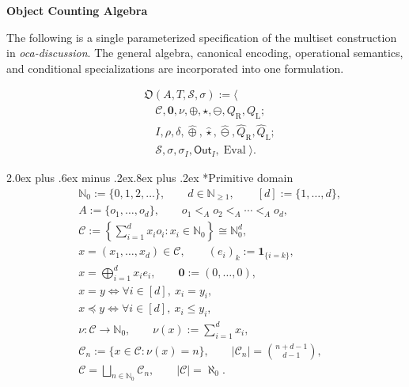 \documentclass[10pt,a5paper]{article}
\makeatletter
\renewcommand\section{\@startsection{section}{1}{\z@}%
  {2.0ex plus .6ex minus .2ex}{.8ex plus .2ex}%
  {\normalfont\large\bfseries}}
\makeatother
\begin{document}
{\LARGE\bfseries Object Counting Algebra\par}
\vspace{2pt}

The following is a single parameterized specification of the multiset construction in \emph{oca-discussion}. The general algebra, canonical encoding, operational semantics, and conditional specializations are incorporated into one formulation.

\[
\boxed{
\begin{aligned}
&\mathfrak O(A,T,\mathscr S,\sigma)
:=\Big\langle
\\[3pt]
&\quad
\mathcal C,\mathbf 0,\nu,\oplus,\star,\ominus,Q_{\mathrm R},Q_{\mathrm L};
\\[3pt]
&\quad
I,\rho,\delta,
\widehat{\oplus},\widehat{\star},\widehat{\ominus},
\widehat Q_{\mathrm R},\widehat Q_{\mathrm L};
\\[3pt]
&\quad
\mathscr S,\sigma,\sigma_I,\mathsf{Out}_I,\operatorname{Eval}
\Big\rangle .
\end{aligned}
}
\]

\section*{Primitive domain}
\begin{align*}
&\mathbb N_0:=\{0,1,2,\ldots\},
\qquad
d\in\mathbb N_{\geq 1},
\qquad
[d]:=\{1,\ldots,d\},
\\
&A:=\{o_1,\ldots,o_d\},
\qquad
o_1<_A o_2<_A\cdots<_A o_d,
\\
&\mathcal C
:=
\left\{
\sum_{i=1}^{d}x_i o_i:
x_i\in\mathbb N_0
\right\}
\cong
\mathbb N_0^{d},
\\
&x=(x_1,\ldots,x_d)\in\mathcal C,
\qquad
(e_i)_k:=\mathbf 1_{\{i=k\}},
\\
&x=\bigoplus_{i=1}^{d}x_i e_i,
\qquad
\mathbf 0:=(0,\ldots,0),
\\
&x=y
\iff
\forall i\in[d],\ x_i=y_i,
\\
&x\preccurlyeq y
\iff
\forall i\in[d],\ x_i\leq y_i,
\\
&\nu:\mathcal C\longrightarrow\mathbb N_0,
\qquad
\nu(x):=\sum_{i=1}^{d}x_i,
\\
&\mathcal C_n:=\{x\in\mathcal C:\nu(x)=n\},
\qquad
|\mathcal C_n|=\binom{n+d-1}{d-1},
\\
&\mathcal C=\bigsqcup_{n\in\mathbb N_0}\mathcal C_n,
\qquad
|\mathcal C|=\aleph_0.
\end{align*}

\end{document}
